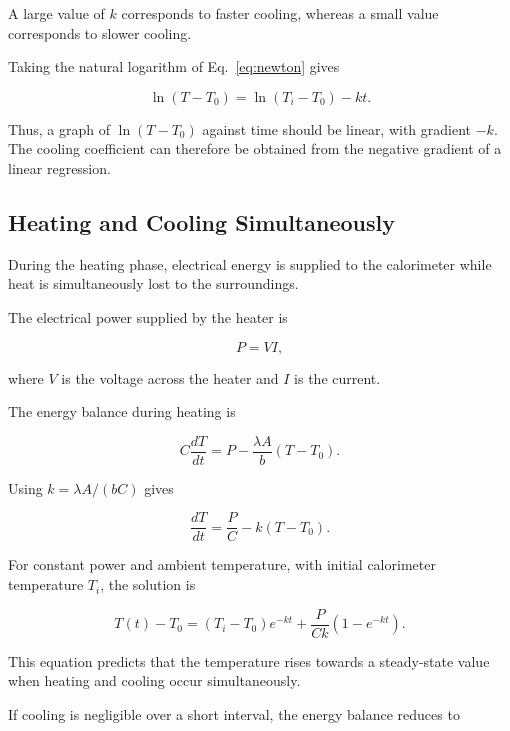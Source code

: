 \documentclass[12pt,a4paper]{article}
\begin{document}
A large value of $k$ corresponds to faster cooling, whereas a
small value corresponds to slower cooling.

Taking the natural logarithm of Eq.~\eqref{eq:newton} gives

\begin{equation}
    \boxed{
    \ln(T-T_0)=\ln(T_i-T_0)-kt
    }.
    \label{eq:logcooling}
\end{equation}

Thus, a graph of $\ln(T-T_0)$ against time should be linear, with
gradient $-k$. The cooling coefficient can therefore be obtained
from the negative gradient of a linear regression.

\subsection{Heating and Cooling Simultaneously}

During the heating phase, electrical energy is supplied to the
calorimeter while heat is simultaneously lost to the surroundings.

The electrical power supplied by the heater is

\begin{equation}
    P=VI,
    \label{eq:power}
\end{equation}

where $V$ is the voltage across the heater and $I$ is the current.

The energy balance during heating is

\[
C\frac{dT}{dt}=P-\frac{\lambda A}{b}(T-T_0).
\]

Using $k=\lambda A/(bC)$ gives

\begin{equation}
    \frac{dT}{dt}
    =\frac{P}{C}-k(T-T_0).
    \label{eq:heatingode}
\end{equation}

For constant power and ambient temperature, with initial
calorimeter temperature $T_i$, the solution is

\begin{equation}
    \boxed{
    T(t)-T_0
    =(T_i-T_0)e^{-kt}+\frac{P}{Ck}(1-e^{-kt})
    }.
    \label{eq:heatingsolution}
\end{equation}

This equation predicts that the temperature rises towards a
steady-state value when heating and cooling occur simultaneously.

If cooling is negligible over a short interval, the energy balance
reduces to
\end{document}
